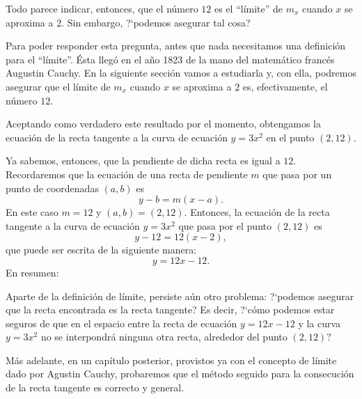 Todo parece indicar, entonces, que el número $12$ es el ``límite'' de $m_x$ cuando $x$ se aproxima
a 2. Sin embargo, ?`podemos asegurar tal cosa?

Para poder responder esta pregunta, antes que nada necesitamos una definición para el ``límite''.
Ésta llegó en el año 1823 de la mano del matemático francés Augustin Cauchy. En la siguiente
sección vamos a estudiarla y, con ella, podremos asegurar que el límite de $m_x$ cuando $x$ se
aproxima a $2$ es, efectivamente, el número $12$.

Aceptando como verdadero este resultado por el momento, obtengamos la ecuación de la recta tangente
a la curva de ecuación $y = 3x^2$ en el punto $(2,12)$.

Ya sabemos, entonces, que la pendiente de dicha recta es igual a $12$. Recordaremos que la ecuación
de una recta de pendiente $m$ que pasa por un punto de coordenadas $(a,b)$ es
\[
y - b = m(x - a).
\]
En este caso $m = 12$ y $(a,b) = (2,12)$. Entonces, la ecuación de la recta tangente a la curva de
ecuación $y = 3x^2$ que pasa por el punto $(2,12)$ es
\[
y - 12 = 12(x - 2),
\]
que puede ser escrita de la siguiente manera:
\[
y = 12x - 12.
\]
En resumen:

Aparte de la definición de límite, persiste aún otro problema: ?`podemos asegurar que la recta
encontrada es la recta tangente? Es decir, ?`cómo podemos estar seguros de que en el espacio entre
la recta de ecuación $y = 12x - 12$ y la curva $y = 3x^2$ no se interpondrá ninguna otra recta,
alrededor del punto $(2,12)?$

Más adelante, en un capítulo posterior, provistos ya con el concepto de límite dado por Agustin
Cauchy, probaremos que el método seguido para la consecución de la recta tangente es correcto y
general.

